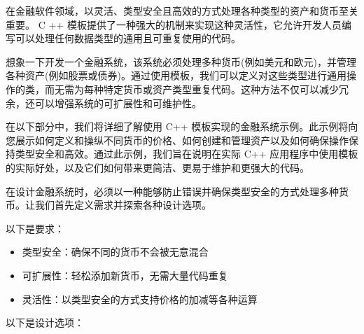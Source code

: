 
在金融软件领域，以灵活、类型安全且高效的方式处理各种类型的资产和货币至关重要。 C ++ 模板提供了一种强大的机制来实现这种灵活性，它允许开发人员编写可以处理任何数据类型的通用且可重复使用的代码。

想象一下开发一个金融系统，该系统必须处理多种货币(例如美元和欧元)，并管理各种资产(例如股票或债券)。通过使用模板，我们可以定义对这些类型进行通用操作的类，而无需为每种特定货币或资产类型重复代码。这种方法不仅可以减少冗余，还可以增强系统的可扩展性和可维护性。

在以下部分中，我们将详细了解使用 C++ 模板实现的金融系统示例。此示例将向您展示如何定义和操纵不同货币的价格、如何创建和管理资产以及如何确保操作保持类型安全和高效。通过此示例，我们旨在说明在实际 C++ 应用程序中使用模板的实际好处，以及它们如何带来更简洁、更易于维护和更强大的代码。


在设计金融系统时，必须以一种能够防止错误并确保类型安全的方式处理多种货币。让我们首先定义需求并探索各种设计选项。

以下是要求：

\begin{itemize}
\item
类型安全：确保不同的货币不会被无意混合

\item
可扩展性：轻松添加新货币，无需大量代码重复

\item
灵活性：以类型安全的方式支持价格的加减等各种运算
\end{itemize}

以下是设计选项：

